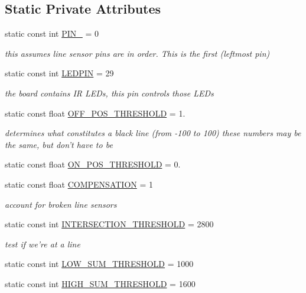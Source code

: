 \subsection*{Static Private Attributes}
\begin{DoxyCompactItemize}
\item 
static const int \hyperlink{classLineSensor_a873c5b45cdfa14ff468db018e1e0055a}{P\-I\-N\-\_} = 0
\begin{DoxyCompactList}\small\item\em this assumes line sensor pins are in order. This is the first (leftmost pin) \end{DoxyCompactList}\item 
static const int \hyperlink{classLineSensor_a09da44442cb9e026af2053b5d0b4f2ce}{L\-E\-D\-P\-I\-N} = 29
\begin{DoxyCompactList}\small\item\em the board contains I\-R L\-E\-Ds, this pin controls those L\-E\-Ds \end{DoxyCompactList}\item 
static const float \hyperlink{classLineSensor_a8db50f7d2c026003180d0c5c7e184d9f}{O\-F\-F\-\_\-\-P\-O\-S\-\_\-\-T\-H\-R\-E\-S\-H\-O\-L\-D} = 1.
\begin{DoxyCompactList}\small\item\em determines what constitutes a black line (from -\/100 to 100) these numbers may be the same, but don't have to be \end{DoxyCompactList}\item 
static const float \hyperlink{classLineSensor_a3e3c5f134159562e56fcd06e55cc7024}{O\-N\-\_\-\-P\-O\-S\-\_\-\-T\-H\-R\-E\-S\-H\-O\-L\-D} = 0.
\item 
static const float \hyperlink{classLineSensor_affb177c49a3381f380b6ff7dd298297f}{C\-O\-M\-P\-E\-N\-S\-A\-T\-I\-O\-N} = 1
\begin{DoxyCompactList}\small\item\em account for broken line sensors \end{DoxyCompactList}\item 
static const int \hyperlink{classLineSensor_a55b9f63bd4c01990f6f2d7baa830d2ec}{I\-N\-T\-E\-R\-S\-E\-C\-T\-I\-O\-N\-\_\-\-T\-H\-R\-E\-S\-H\-O\-L\-D} = 2800
\begin{DoxyCompactList}\small\item\em test if we're at a line \end{DoxyCompactList}\item 
static const int \hyperlink{classLineSensor_a929091ad1746a0a337c2259ba79c959a}{L\-O\-W\-\_\-\-S\-U\-M\-\_\-\-T\-H\-R\-E\-S\-H\-O\-L\-D} = 1000
\item 
static const int \hyperlink{classLineSensor_a3e7f65abc054f54cb74f8aa3eb552e89}{H\-I\-G\-H\-\_\-\-S\-U\-M\-\_\-\-T\-H\-R\-E\-S\-H\-O\-L\-D} = 1600
\end{DoxyCompactItemize}


